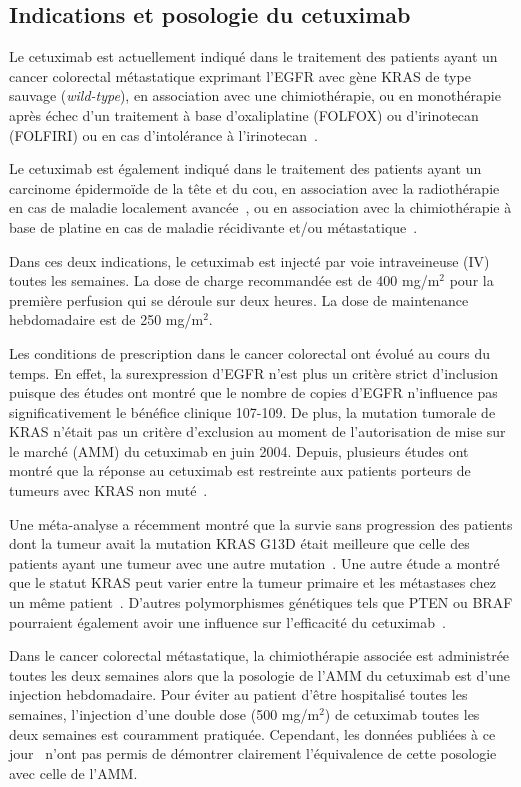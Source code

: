 \subsection{Indications et posologie du cetuximab}
Le cetuximab est actuellement indiqué dans le traitement des patients ayant un cancer colorectal métastatique exprimant l'EGFR avec gène KRAS de type sauvage (\textit{wild-type}), en association avec une chimiothérapie, ou en monothérapie après échec d'un traitement à base d'oxaliplatine (FOLFOX) ou d'irinotecan (FOLFIRI) ou en cas d'intolérance à l'irinotecan~\citep{REF104}.

Le cetuximab est également indiqué dans le traitement des patients ayant un carcinome épidermoïde de la tête et du cou, en association avec la radiothérapie en cas de maladie localement avancée~\citep{REF105}, ou en association avec la chimiothérapie à base de platine en cas de maladie récidivante et/ou métastatique~\citep{REF106}.

Dans ces deux indications, le cetuximab est injecté par voie intraveineuse (IV) toutes les semaines. La dose de charge recommandée est de 400 mg/m$^2$ pour la première perfusion qui se déroule sur deux heures. La dose de maintenance hebdomadaire est de 250 mg/m$^2$.

Les conditions de prescription dans le cancer colorectal ont évolué au cours du temps. En effet, la surexpression d'EGFR n'est plus un critère strict d'inclusion puisque des études ont montré que le nombre de copies d'EGFR n'influence pas significativement le bénéfice clinique 107-109. De plus, la mutation tumorale de KRAS n'était pas un critère d'exclusion au moment de l'autorisation de mise sur le marché (AMM) du cetuximab en juin 2004. Depuis, plusieurs études ont montré que la réponse au cetuximab est restreinte aux patients porteurs de tumeurs avec KRAS non muté~\citep{REF110, REF111, REF112, REF113}.

Une méta-analyse a récemment montré que la survie sans progression des patients dont la tumeur avait la mutation KRAS G13D était meilleure que celle des patients ayant une tumeur avec une autre mutation~\citep{REF114}. Une autre étude a montré que le statut KRAS peut varier entre la tumeur primaire et les métastases chez un même patient~\citep{REF115}. D'autres polymorphismes génétiques tels que PTEN ou BRAF pourraient également avoir une influence sur l'efficacité du cetuximab~\citep{REF116, REF117}.

Dans le cancer colorectal métastatique, la chimiothérapie associée est administrée toutes les deux semaines alors que la posologie de l'AMM du cetuximab est d'une injection hebdomadaire. Pour éviter au patient d'être hospitalisé toutes les semaines, l'injection d'une double dose (500 mg/m$^2$) de cetuximab toutes les deux semaines est couramment pratiquée. Cependant, les données publiées à ce jour~\citep{REF118} n'ont pas permis de démontrer clairement l'équivalence de cette posologie avec celle de l'AMM. 

